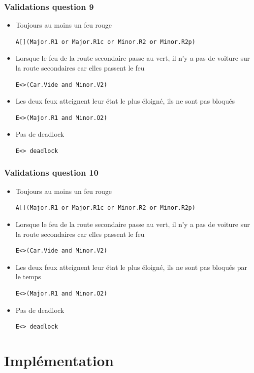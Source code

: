 \documentclass[11pt]{article}
\begin{document}
\subsubsection{Validations question 9}

\begin{itemize}
	\item Toujours au moins un feu rouge
\begin{verbatim}
A[](Major.R1 or Major.R1c or Minor.R2 or Minor.R2p)
\end{verbatim}
	
	\item Lorsque le feu de la route secondaire passe au vert, il n'y a pas de voiture sur la route secondaires car elles passent le feu
\begin{verbatim}
E<>(Car.Vide and Minor.V2)
\end{verbatim}
	
	\item Les deux feux atteignent leur état le plus éloigné, ils ne sont pas bloqués
\begin{verbatim}
E<>(Major.R1 and Minor.O2)
\end{verbatim}
	
	\item Pas de deadlock
\begin{verbatim}
E<> deadlock
\end{verbatim}

\end{itemize}

\subsubsection{Validations question 10}

\begin{itemize}
	\item Toujours au moins un feu rouge
\begin{verbatim}
A[](Major.R1 or Major.R1c or Minor.R2 or Minor.R2p)
\end{verbatim}

	\item Lorsque le feu de la route secondaire passe au vert, il n'y a pas de voiture sur la route secondaires car elles passent le feu
\begin{verbatim}
E<>(Car.Vide and Minor.V2)
\end{verbatim}

	\item Les deux feux atteignent leur état le plus éloigné, ils ne sont pas bloqués par le temps
\begin{verbatim}
E<>(Major.R1 and Minor.O2)
\end{verbatim}

	\item Pas de deadlock
\begin{verbatim}
E<> deadlock
\end{verbatim}
\end{itemize}

\section{Implémentation}
\end{document}
